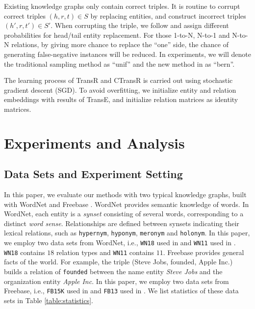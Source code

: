     Existing knowledge graphs only contain correct triples. It is routine to corrupt correct triples $(h, r, t) \in S$ by replacing entities, and construct incorrect triples $(h', r, t') \in S'$. When corrupting the triple, we follow  and assign different probabilities for head/tail entity replacement. For those 1-to-N, N-to-1 and N-to-N relations, by giving more chance to replace the ``one'' side, the chance of generating false-negative instances will be reduced. In experiments, we will denote the traditional sampling method as ``unif'' and the new method in   as ``bern''.

    The learning process of TransR and CTransR is carried out using stochastic gradient descent (SGD). To avoid overfitting, we initialize entity and relation embeddings with results of TransE, and initialize relation matrices as identity matrices.


    \section{Experiments and Analysis}
    \label{sec:experiment}

    \subsection{Data Sets and Experiment Setting}
    In this paper, we evaluate our methods with two typical knowledge graphs, built with WordNet  and Freebase . WordNet provides semantic knowledge of words. In WordNet, each entity is a \emph{synset} consisting of several words, corresponding to a distinct \emph{word sense}. Relationships are defined between synsets indicating their lexical relations, such as \texttt{hypernym}, \texttt{hyponym}, \texttt{meronym} and \texttt{holonym}. In this paper, we employ two data sets from WordNet, i.e., \texttt{WN18} used in  and \texttt{WN11} used in . \texttt{WN18} contains $18$ relation types and \texttt{WN11} contains $11$. Freebase provides general facts of the world. For example, the triple (Steve Jobs, founded, Apple Inc.) builds a relation of \texttt{founded} between the name entity \emph{Steve Jobs} and the organization entity \emph{Apple Inc}. In this paper, we employ two data sets from Freebase, i.e.,  \texttt{FB15K} used in  and \texttt{FB13} used in . We list statistics of these data sets in Table \ref{table:statistics}.

